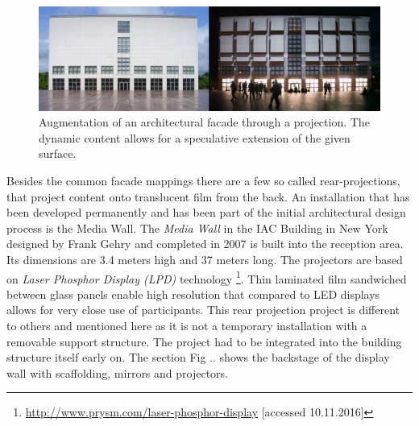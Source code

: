 
\begin{figure}[htp]
\centering
\includegraphics[width=\textwidth]{Illustrations/Ungers_day_night.jpg}
\caption{Augmentation of an architectural facade through a projection. The dynamic content allows for a speculative extension of the given surface.}
\label{fig:ungers}
\end{figure}


Besides the common facade mappings there are a few so called rear-projections, that project content onto translucent film from the back. An installation that has been developed permanently and has been part of the initial architectural design process is the Media Wall.
The \textit{Media Wall}  in the IAC Building in New York designed by Frank Gehry and completed in 2007 is built into the reception area. 
Its dimensions are 3.4 meters high and 37 meters long. 
The projectors are based on \textit{Laser Phosphor Display (LPD)}  technology \footnote{ \url{http://www.prysm.com/laser-phosphor-display} [accessed 10.11.2016]}.
Thin laminated film sandwiched between glass panels enable high resolution that compared to LED displays allows for very close use of participants.
This rear projection project is different to others and mentioned here as it is not a temporary installation with a removable support structure. The project had to be integrated into the building structure itself early on. The section Fig .. shows the backstage of the display wall with scaffolding, mirrors and projectors.

